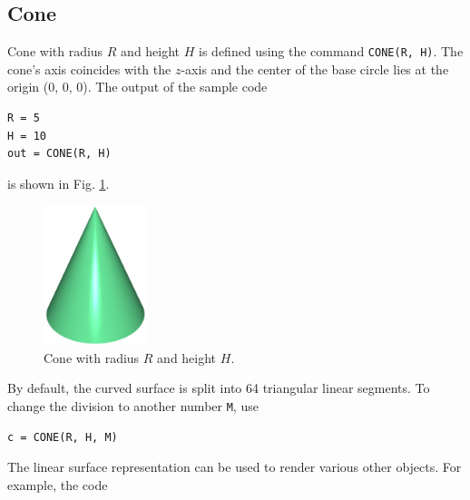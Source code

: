 \noindent

\subsection{Cone}\label{par:coco}

Cone with radius $R$ and height $H$ is defined using the command 
{\tt CONE(R, H)}. The cone's axis coincides with the $z$-axis and 
the center of the base circle lies at the origin (0, 0, 0).
The output of the sample code\\

\begin{bbox}
\begin{verbatim}
R = 5
H = 10
out = CONE(R, H)
\end{verbatim}
\end{bbox}
\vspace{6mm}

\noindent
is shown in Fig. \ref{fig:convexhull-2a}.

\begin{figure}[!ht]
\begin{center}
\includegraphics[width=0.27\textwidth]{img/convexhull-2.png}
\end{center}
\vspace{-4mm}
\caption{Cone with radius $R$ and height $H$.}
\label{fig:convexhull-2a}
\end{figure}
\noindent
By default, the curved surface is split into 64 triangular linear segments. To 
change the division to another number {\tt M}, use\\

\begin{bbox}
\begin{verbatim}
c = CONE(R, H, M)
\end{verbatim}
\end{bbox}
\vspace{6mm}

\noindent
The linear surface representation can be used 
to render various other objects. For example, the code \\

